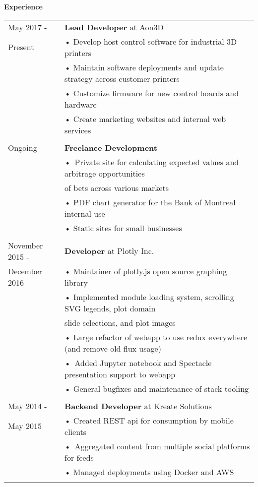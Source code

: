 \documentclass[10pt,notitlepage,oneside,draft]{article}
\begin{document}
\begin{flushleft}
  \large
  \textbf{Experience} \\
  \vspace{12pt}
  \normalsize
  \begin{tabular}{ p{86pt} | l}
    May 2017 - & \textbf{Lead Developer} at Aon3D \\
    Present & • Develop host control software for industrial 3D printers \\
    & • Maintain software deployments and update strategy across customer printers \\ 
    & • Customize firmware for new control boards and hardware \\
    & • Create marketing websites and internal web services \\
    & \\ 
    Ongoing & \textbf{Freelance Development} \\
    & • Private site for calculating expected values and arbitrage opportunities \\
    & \hspace{5pt} of bets across various markets \\
    & • PDF chart generator for the Bank of Montreal internal use \\
    & • Static sites for small businesses \\
    & \\
    November 2015 - & \textbf{Developer} at Plotly Inc. \\
    December 2016 & • Maintainer of plotly.js open source graphing library \\
    & • Implemented module loading system, scrolling SVG legends, plot domain \\
    & \hspace{5pt} slide selections, and plot images \\
    & • Large refactor of webapp to use redux everywhere (and remove old flux usage) \\
    & • Added Jupyter notebook and Spectacle presentation support to webapp \\
    & • General bugfixes and maintenance of stack tooling \\
    & \\
    May 2014 - & \textbf{Backend Developer} at Kreate Solutions \\
    May 2015 & • Created REST api for consumption by mobile clients \\
    & • Aggregated content from multiple social platforms for feeds \\
    & • Managed deployments using Docker and AWS \\
    & \\
  \end{tabular}
  \vspace{20pt}



\end{flushleft}
\end{document}
